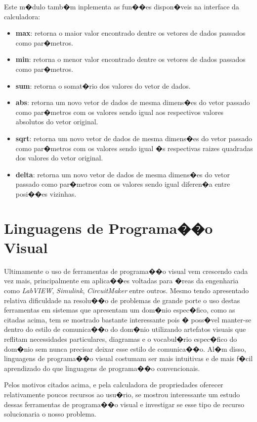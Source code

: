 \documentclass[dissertacao,modelo1,brazil]{ThesisPUC}
\begin{document}
Este m�dulo tamb�m inplementa as fun��es dispon�veis na interface da calculadora:

\begin{itemize}
  \item \textbf{max}: retorna o maior valor encontrado dentre os vetores de dados passados como
  par�metros.
  \item \textbf{min}: retorna o menor valor encontrado dentre os vetores de dados passados como
  par�metros.
  \item \textbf{sum}: retorna o somat�rio dos valores do vetor de dados.
  \item \textbf{abs}: retorna um novo vetor de dados de mesma dimens�es do vetor passado como
  par�metros com os valores sendo igual aos respectivos valores absolutos do vetor original.
  \item \textbf{sqrt}: retorna um novo vetor de dados de mesma dimens�es do vetor passado como
  par�metros com os valores sendo igual �s respectivas raizes quadradas dos valores do vetor original.
  \item \textbf{delta}: retorna um novo vetor de dados de mesma dimens�es do vetor passado como
  par�metros com os valores sendo igual diferen�a entre posi��es vizinhas.
\end{itemize}

\chapter{Linguagens de Programa��o Visual}

Ultimamente o uso de ferramentas de programa��o visual vem crescendo cada vez mais,
principalmente em aplica��es voltadas para �reas da engenharia como \emph{LabVIEW},
\emph{Simulink}, \emph{CircuitMaker} entre outros.
Mesmo tendo apresentado relativa dificuldade
na resolu��o de problemas de grande porte
o uso destas ferramentas em sistemas que apresentam um dom�nio espec�fico,
como as citadas acima, tem se mostrado bastante interessante pois � poss�vel
manter-se dentro do estilo de comunica��o do dom�nio utilizando artefatos 
visuais que reflitam necessidades particulares, diagramas e o vocabul�rio
espec�fico do dom�nio 
sem nunca precisar deixar esse estilo de comunica��o. Al�m disso,
linguagens de programa��o visual costumam ser mais intuitivas e
de mais f�cil aprendizado do que linguagens de programa��o convencionais.

Pelos motivos citados acima, e pela calculadora de propriedades oferecer
relativamente poucos recursos ao usu�rio, se mostrou interessante um
estudo dessas ferramentas de programa��o visual e investigar se esse
tipo de recurso solucionaria o nosso problema.
\end{document}
